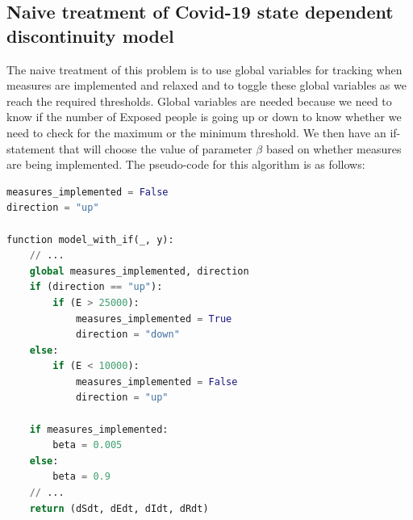 \subsection{Naive treatment of Covid-19 state dependent discontinuity model}
\label{subsection:naive_state_problem}
The naive treatment of this problem is to use global variables for tracking when measures are implemented and relaxed and to toggle these global variables as we reach the required thresholds. Global variables are needed because we need to know if the number of Exposed people is going up or down to know whether we need to check for the maximum or the minimum threshold. We then have an if-statement that will choose the value of parameter $\beta$ based on whether measures are being implemented. The pseudo-code for this algorithm is as follows:

\begin{minipage}{\linewidth}
\begin{lstlisting}[language=Python]
measures_implemented = False
direction = "up"

function model_with_if(_, y):
    // ...
    global measures_implemented, direction
    if (direction == "up"):
        if (E > 25000):
            measures_implemented = True
            direction = "down"
    else:
        if (E < 10000):
            measures_implemented = False
            direction = "up"

    if measures_implemented:
        beta = 0.005 
    else:
        beta = 0.9
    // ...
    return (dSdt, dEdt, dIdt, dRdt)
\end{lstlisting}
\end{minipage}

